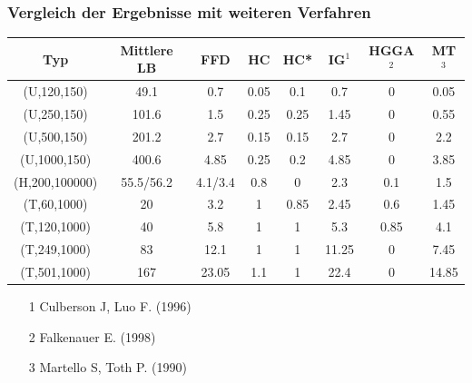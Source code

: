 \documentclass{beamer}
\begin{document}
\begin{frame}
\frametitle{Vergleich der Ergebnisse mit weiteren Verfahren}

\begin{scriptsize}
\begin{table}
\begin{tabular}{c c c c c c c c}
\toprule
\textbf{Typ} &   \textbf{Mittlere LB} & \textbf{FFD} & \textbf{HC} & \textbf{HC*}  & \textbf{IG$^1$} & \textbf{HGGA$^2$} & \textbf{MT$^3$}\\
\midrule
(U,120,150) & 49.1  & 0.7 & 0.05 & 0.1 & 0.7 & 0 & 0.05 \\
(U,250,150) & 101.6  & 1.5 & 0.25 & 0.25 & 1.45 & 0 & 0.55\\
(U,500,150)  & 201.2  & 2.7 & 0.15 & 0.15 &  2.7 & 0 & 2.2\\
(U,1000,150)  & 400.6  & 4.85 & 0.25 & 0.2 & 4.85 & 0 & 3.85\\ \midrule
(H,200,100000)  & 55.5/56.2  & 4.1/3.4 & 0.8 & 0 & 2.3 & 0.1 & 1.5 \\\midrule
(T,60,1000)     & 20 & 3.2 & 1 & 0.85 & 2.45 & 0.6 & 1.45 \\
(T,120,1000)    & 40  & 5.8 & 1 &1 & 5.3 & 0.85 & 4.1\\
(T,249,1000)      & 83  & 12.1 & 1 & 1 & 11.25 & 0 & 7.45 \\
(T,501,1000)      & 167  & 23.05 & 1.1 & 1 & 22.4 & 0 & 14.85 \\
\bottomrule
\end{tabular}
\end{table}
\end{scriptsize}
\begin{scriptsize}
\begin{itemize}
\item[1] Culberson J, Luo F. (1996)
\item[2] Falkenauer E. (1998)
\item[3] Martello S, Toth P. (1990)
\end{itemize}
\end{scriptsize}


\end{frame}
\end{document}

